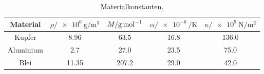 \begin{table}
    \centering
    \caption{Materialkonstanten\cite{v201}.}
    \label{tab:const}
    \begin{tabular}{c S[table-format=2.2(0)e0] S[table-format=3.1(0)e0] S[table-format=2.1] S[table-format=3.1(0)e0] }
        \toprule
        {Material} & {$ρ/\SI[per-mode=reciprocal]{e6}{\gram\per\m\cubed}$} & {$M/\si[per-mode=reciprocal]{\gram\per\mol}$} & {$α/\SI[per-mode=reciprocal]{e-6}{\per\kelvin}$} & {$κ/\SI[per-mode=reciprocal]{e9}{\newton\per\meter\squared}$} \\
        \midrule
        {Kupfer} & 8.96  & 63.5  & 16.8  & 136.0     \\
        {Aluminium} & 2.7   & 27.0  & 23.5  & 75.0  \\
        {Blei} & 11.35 & 207.2 & 29.0  & 42.0  \\
       \bottomrule
    \end{tabular}
\end{table}
